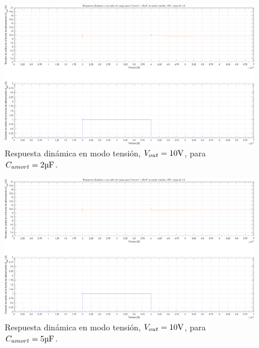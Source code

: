 \clearpage

\begin{figure}[H] %
\begin{center}
\includegraphics[width=1.1 \textwidth, angle=90]{./img/plots/dynamic/power_supply_CAMORT_10u_STEP_Modo1.png}
\caption{\label{fig:fig_power_supply_CAMORT_STEP_10u_Modo1}\footnotesize{Respuesta dinámica en modo tensión, $V_{out} = 10 \si[per-mode=symbol]{\volt}$, para $C_{amort} = 2 \si[per-mode=symbol]{\micro\farad} $.}}
\end{center}
\end{figure}

\clearpage

\begin{figure}[H] %
\begin{center}
\includegraphics[width=1.1 \textwidth, angle=90]{./img/plots/dynamic/power_supply_CAMORT_22u_STEP_Modo1.png}
\caption{\label{fig:fig_power_supply_CAMORT_STEP_22u_Modo1}\footnotesize{Respuesta dinámica en modo tensión, $V_{out} = 10 \si[per-mode=symbol]{\volt}$, para $C_{amort} = 5 \si[per-mode=symbol]{\micro\farad} $.}}
\end{center}
\end{figure}


